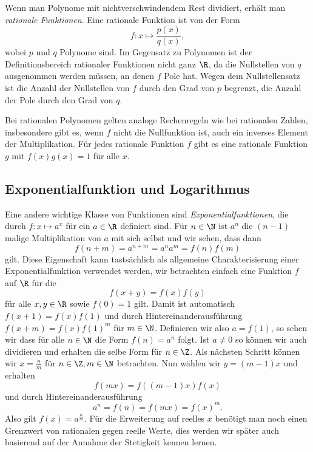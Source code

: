 \documentclass[letterpaper,10pt,english]{jupyterBook}
\begin{document}
Wenn man Polynome mit nichtverschwindendem Rest dividiert, erhält man \emph{rationale Funktionen}.
Eine rationale Funktion ist von der Form
\begin{equation*}
 f:x\mapsto  \frac{p(x)}{q(x)},\end{equation*}
wobei \(p\) und \(q\) Polynome sind. Im Gegensatz zu Polynomen ist der Definitionsbereich rationaler Funktionen nicht ganz \(\R\), da die Nullstellen von \(q\) ausgenommen werden müssen, an denen \(f\) Pole hat. Wegen dem Nullstellensatz ist die Anzahl der Nullstellen von \(f\) durch den Grad von \(p\) begrenzt, die Anzahl der Pole durch den Grad von \(q\).

Bei rationalen Polynomen gelten analoge Rechenregeln wie bei rationalen Zahlen, insbesondere gibt es, wenn \(f\) nicht die Nullfunktion ist, auch ein inverses Element der Multiplikation. Für jedes rationale Funktion \(f\) gibt es eine rationale Funktion \(g\) mit \(f(x) g(x) = 1\) für alle \(x\).


\subsection{Exponentialfunktion und Logarithmus}
\label{\detokenize{vorkurs/funktionen:exponentialfunktion-und-logarithmus}}
Eine andere wichtige Klasse von Funktionen sind \emph{Exponentialfunktionen}, die durch \(f: x\mapsto a^x\) für ein \(a \in \R\) definiert sind. Für \(n \in \N\) ist \(a^n\) die \((n-1)\) malige Multiplikation von \(a\) mit sich selbst und wir sehen, dass dann
\begin{equation*}
 f(n+m) = a^{n+m}  = a^n a^m  = f(n) f(m)\end{equation*}
gilt. Diese Eigenschaft kann tastsächlich als allgemeine Charakterisierung einer Exponentialfunktion verwendet werden, wir betrachten einfach eine Funktion \(f\) auf \(\R\) für die
\begin{equation*}
 f(x+y) =  f(x) f(y)\end{equation*}
für alle \(x,y \in \R\) sowie \(f(0)=1\)
gilt. Damit ist automatisch \(f(x+1) = f(x) f(1)\) und durch Hintereinanderausführung \(f(x+m) = f(x) f(1)^m\) für \(m \in \N\). Definieren wir also \(a=f(1)\), so sehen wir dass für alle \(n \in \N\) die Form \(f(n) = a^n\) folgt. Ist \(a \neq 0\) so können wir auch dividieren und erhalten die selbe Form für \(n \in \Z\). Als nächsten Schritt können wir \(x= \frac{n}m\) für \(n \in \Z, m \in \N\) betrachten. Nun wählen wir \(y=(m-1) x\) und erhalten
\begin{equation*}
 f(m x) = f((m-1)x) f(x)\end{equation*}
und durch Hintereinanderausführung
\begin{equation*}
 a^n = f(n) = f(mx) = f(x)^m.\end{equation*}
Also gilt \(f(x) = a^{\frac{n}m}. \) Für die Erweiterung auf reelles \(x\) benötigt man noch einen Grenzwert von rationalen gegen reelle Werte, dies werden wir später auch basierend auf der Annahme der Stetigkeit kennen lernen.
\end{document}
